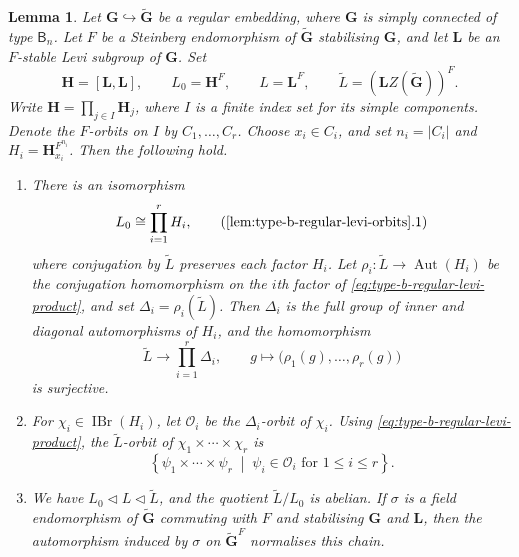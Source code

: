 \documentclass[10pt]{amsart}
\newtheorem{lemma}[theorem]{Lemma}
\theoremstyle{definition}
\renewcommand{\leq}{\leqslant}
\DeclareMathOperator{\Aut}{Aut}
\DeclareMathOperator{\IBr}{IBr}
\numberwithin{equation}{section}
\numberwithin{table}{section}
\begin{document}
\begin{lemma}\label{lem:type-b-regular-levi-orbits}
Let $\mathbf G\hookrightarrow\widetilde{\mathbf G}$ be a regular
embedding, where $\mathbf G$ is simply connected of type $\mathsf B_n$.
Let $F$ be a Steinberg endomorphism of $\widetilde{\mathbf G}$
stabilising $\mathbf G$, and let $\mathbf L$ be an $F$-stable Levi
subgroup of $\mathbf G$. Set
\[
 \mathbf H=[\mathbf L,\mathbf L],\qquad
 L_0=\mathbf H^F,\qquad L=\mathbf L^F,\qquad
 \widetilde L=(\mathbf LZ(\widetilde{\mathbf G}))^F.
\]
Write $\mathbf H=\prod_{j\in I}\mathbf H_j$, where $I$ is a finite index set
for its simple components. Denote the $F$-orbits on $I$ by $C_1,\ldots,C_r$.
Choose $x_i\in C_i$, and set $n_i=|C_i|$ and $H_i=\mathbf H_{x_i}^{F^{n_i}}$.
Then the following hold.
\begin{enumerate}[label=\textup{(\arabic*)}]
\item There is an isomorphism
\[
 L_0\cong\prod_{i=1}^rH_i,\tag{\ref{lem:type-b-regular-levi-orbits}.1}
 \label{eq:type-b-regular-levi-product}
\]
where conjugation by $\widetilde L$ preserves each factor $H_i$.
Let $\rho_i:\widetilde L\longrightarrow\Aut(H_i)$ be the conjugation homomorphism on the $i$th factor of
\eqref{eq:type-b-regular-levi-product}, and set
$\Delta_i=\rho_i(\widetilde L)$.  Then $\Delta_i$ is the full group
of inner and diagonal automorphisms of $H_i$, and the homomorphism
\[
 \widetilde L\longrightarrow\prod_{i=1}^r\Delta_i,\qquad
 g\longmapsto\bigl(\rho_1(g),\ldots,\rho_r(g)\bigr)
\]
is surjective.
\item For $\chi_i\in\IBr(H_i)$, let $\mathcal O_i$ be the
$\Delta_i$-orbit of $\chi_i$.  Using
\eqref{eq:type-b-regular-levi-product}, the $\widetilde L$-orbit of
$\chi_1\times\cdots\times\chi_r$ is
\[
 \left\{\psi_1\times\cdots\times\psi_r\;\middle|\;
 \psi_i\in\mathcal O_i\text{ for }1\leq i\leq r\right\}.
\]
\item We have $L_0\lhd L\lhd\widetilde L$, and the quotient
$\widetilde L/L_0$ is abelian.
If $\sigma$ is a field endomorphism of $\widetilde{\mathbf G}$ commuting
with $F$ and stabilising $\mathbf G$ and $\mathbf L$, then the
automorphism induced by $\sigma$ on $\widetilde{\mathbf G}^F$
normalises this chain.
\end{enumerate}
\end{lemma}
\end{document}
